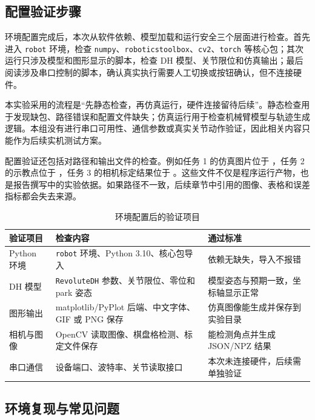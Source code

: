 \subsection{配置验证步骤}

环境配置完成后，本次从软件依赖、模型加载和运行安全三个层面进行检查。首先进入 \texttt{robot} 环境，检查 \texttt{numpy}、\texttt{roboticstoolbox}、\texttt{cv2}、\texttt{torch} 等核心包；其次运行只涉及模型和图形显示的脚本，检查 DH 模型、关节限位和仿真输出；最后阅读涉及串口控制的脚本，确认真实执行需要人工切换或按钮确认，但不连接硬件。

本实验采用的流程是“先静态检查，再仿真运行，硬件连接留待后续”。静态检查用于发现缺包、路径错误和配置文件缺失；仿真运行用于检查机械臂模型与轨迹生成逻辑。本组没有进行串口可用性、通信参数或真实关节动作验证，因此相关内容只能作为后续实机测试方案。

配置验证还包括对路径和输出文件的检查。例如任务 1 的仿真图片位于 ，任务 2 的示教点位于 ，任务 3 的相机标定结果位于 。这些文件不仅是程序运行产物，也是报告撰写中的实验依据。如果路径不一致，后续章节中引用的图像、表格和误差指标都会失去来源。

\begin{table}[H]
  \centering
  \caption{环境配置后的验证项目}
  \label{tab:env-checklist}
  \small
  \begin{tabularx}{\textwidth}{L{2.6cm}Y Y}
    \toprule
    验证项目 & 检查内容 & 通过标准 \\
    \midrule
    Python 环境 & \texttt{robot} 环境、Python 3.10、核心包导入 & 依赖无缺失，导入不报错 \\
    DH 模型 & \texttt{RevoluteDH} 参数、关节限位、零位和 park 姿态 & 模型姿态与预期一致，坐标轴显示正常 \\
    图形输出 & matplotlib/PyPlot 后端、中文字体、GIF 或 PNG 保存 & 仿真图像能生成并保存到实验目录 \\
    相机与图像 & OpenCV 读取图像、棋盘格检测、标定文件保存 & 能检测角点并生成 JSON/NPZ 结果 \\
    串口通信 & 设备端口、波特率、关节读取接口 & 本次未连接硬件，后续需单独验证 \\
    \bottomrule
  \end{tabularx}
\end{table}

\subsection{环境复现与常见问题}


